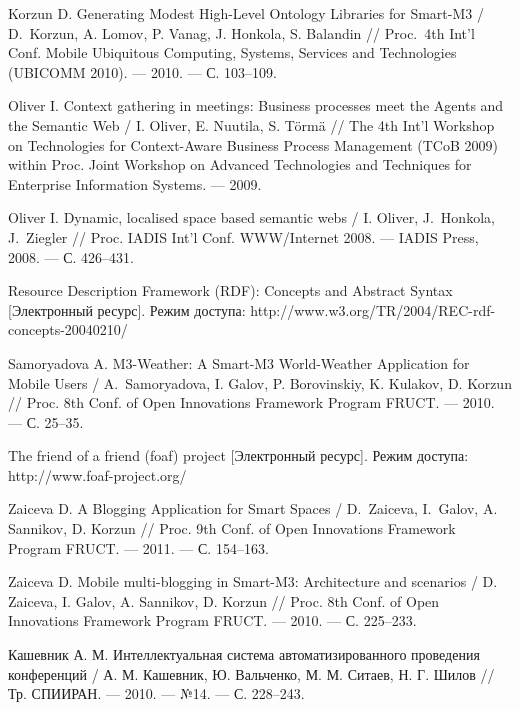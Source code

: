 \begin{thebibliography}{99}
Korzun D. Generating Modest High-Level Ontology Libraries for Smart-M3 / D.~Korzun, A. Lomov, P. Vanag, 
J. Honkola, S. Balandin // Proc.~4th Int'l Conf. Mobile Ubiquitous Computing, Systems, Services and Technologies (UBICOMM 2010). --- 2010. --- С. 103--109.

Oliver I. Context gathering in meetings: Business processes meet the Agents and the Semantic Web / 
I. Oliver, E. Nuutila, S. T{\"o}rm{\"a} // The 4th Int'l Workshop on Technologies for Context-Aware Business Process Management (TCoB 2009) within Proc. Joint Workshop on Advanced Technologies and Techniques for Enterprise Information Systems. --- 2009.

Oliver I. Dynamic, localised space based semantic webs / 
I. Oliver, J.~Honkola, J.~Ziegler //
Proc. IADIS Int’l Conf. WWW/Internet 2008. --- IADIS Press, 2008. --- С. 426--431.

Resource Description Framework (RDF):
Concepts and Abstract Syntax [Электронный ресурс].
Режим доступа:
http://www.w3.org/TR/2004/REC-rdf-concepts-20040210/

Samoryadova A. M3-Weather: A Smart-M3 World-Weather Application for Mobile Users / A.~Samoryadova, I. Galov, P. Borovinskiy, K. Kulakov, D. Korzun // Proc. 8th Conf. of Open Innovations Framework Program FRUCT. --- 2010. --- С. 25--35.

The friend of a friend (foaf) project [Электронный ресурс]. Режим доступа: http://www.foaf-project.org/

Zaiceva D. A Blogging Application for Smart Spaces / D.~Zaiceva,
I.~Galov, A. Sannikov, D. Korzun // Proc. 9th Conf. of Open Innovations Framework Program FRUCT. --- 2011. --- С. 154--163.

Zaiceva D. Mobile multi-blogging in Smart-M3: Architecture and scenarios / 
D. Zaiceva, I. Galov, A. Sannikov, D. Korzun // Proc. 8th Conf. of Open Innovations Framework Program FRUCT. --- 2010. --- С. 225--233.


Кашевник А. М. Интеллектуальная система автоматизированного проведения конференций / 
А. М. Кашевник, Ю. Вальченко, М. М. Ситаев, Н. Г. Шилов // Тр. СПИИРАН. --- 2010. --- №14. --- С. 228--243.

\end{thebibliography}





